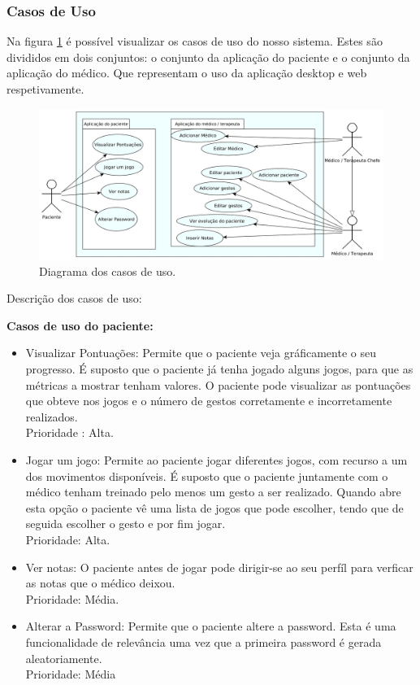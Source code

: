 \documentclass{TTUPhD}
\begin{document}
\subsubsection{Casos de Uso}

Na figura \ref{fig:use_case} é possível visualizar os casos de uso do nosso sistema.
Estes são divididos em dois conjuntos: o conjunto da aplicação do paciente e o conjunto da aplicação do médico.
Que representam o uso da aplicação desktop e web respetivamente.

\begin{figure}[h!]
    \center
    \includegraphics[scale=0.17]{./img/use_case.jpg}
    \caption{Diagrama dos casos de uso.}
    \label{fig:use_case}
\end{figure}

\newpage

Descrição dos casos de uso:

\textbf{Casos de uso do paciente:}
\begin{itemize}
	\item Visualizar Pontuações: Permite que o paciente veja gráficamente o seu progresso.
		  É suposto que o paciente já tenha jogado alguns jogos, para que as métricas a mostrar tenham valores.
		  O paciente pode visualizar as pontuações que obteve nos jogos e o número de gestos corretamente e incorretamente realizados.\\
          Prioridade : Alta.
	\item Jogar um jogo: Permite ao paciente jogar diferentes jogos, com recurso a um dos movimentos disponíveis.
		  É suposto que o paciente juntamente com o médico tenham treinado pelo menos um gesto a ser realizado.
          Quando abre esta opção o paciente vê uma lista de jogos que pode escolher, tendo que de seguida escolher o gesto e por fim jogar.\\
          Prioridade: Alta.
	\item Ver notas: O paciente antes de jogar pode dirigir-se ao seu perfíl para verficar as notas que o médico deixou.\\
		  Prioridade: Média.
	\item Alterar a Password: Permite que o paciente altere a password.
		  Esta é uma funcionalidade de relevância uma vez que a primeira password é gerada aleatoriamente.\\
		  Prioridade: Média
\end{itemize}
\end{document}
